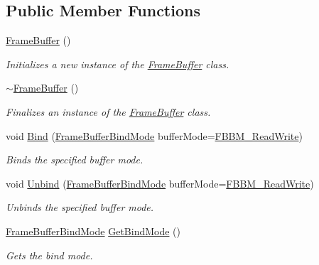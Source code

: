 \subsection*{Public Member Functions}
\begin{DoxyCompactItemize}
\item 
\hyperlink{class_frame_buffer_a6f3763f4551f221b86ca033e2b315c42}{Frame\+Buffer} ()
\begin{DoxyCompactList}\small\item\em Initializes a new instance of the \hyperlink{class_frame_buffer}{Frame\+Buffer} class. \end{DoxyCompactList}\item 
\hyperlink{class_frame_buffer_aef8be9884e8cc0fc3f3692e6c6968fa1}{$\sim$\+Frame\+Buffer} ()
\begin{DoxyCompactList}\small\item\em Finalizes an instance of the \hyperlink{class_frame_buffer}{Frame\+Buffer} class. \end{DoxyCompactList}\item 
void \hyperlink{class_frame_buffer_ae7e61568475fba3b15e446c9061833ea}{Bind} (\hyperlink{_frame_buffer_8h_a3318e72469ce5bc8393bd02d39bc3742}{Frame\+Buffer\+Bind\+Mode} buffer\+Mode=\hyperlink{_frame_buffer_8h_a3318e72469ce5bc8393bd02d39bc3742ae77f3997d632fbdbe50556a908b53be1}{F\+B\+B\+M\+\_\+\+Read\+Write})
\begin{DoxyCompactList}\small\item\em Binds the specified buffer mode. \end{DoxyCompactList}\item 
void \hyperlink{class_frame_buffer_a1e114b325998ec4e4b9a9ea090d64ae8}{Unbind} (\hyperlink{_frame_buffer_8h_a3318e72469ce5bc8393bd02d39bc3742}{Frame\+Buffer\+Bind\+Mode} buffer\+Mode=\hyperlink{_frame_buffer_8h_a3318e72469ce5bc8393bd02d39bc3742ae77f3997d632fbdbe50556a908b53be1}{F\+B\+B\+M\+\_\+\+Read\+Write})
\begin{DoxyCompactList}\small\item\em Unbinds the specified buffer mode. \end{DoxyCompactList}\item 
\hyperlink{_frame_buffer_8h_a3318e72469ce5bc8393bd02d39bc3742}{Frame\+Buffer\+Bind\+Mode} \hyperlink{class_frame_buffer_a850ac6fb641f1c7a2b4e15b70f5a2286}{Get\+Bind\+Mode} ()
\begin{DoxyCompactList}\small\item\em Gets the bind mode. \end{DoxyCompactList}\item 

\end{DoxyCompactItemize}
